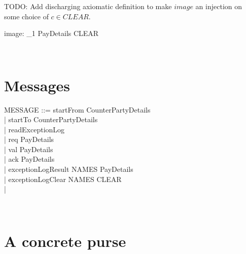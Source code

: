%
TODO: Add discharging axiomatic definition to make
$image$ an injection on some choice of $c \in CLEAR$.
%
\begin{LADef}
\begin{axdef}
   image: \power_1 PayDetails \inj CLEAR
\end{axdef}~\end{LADef}

\section{Messages}
\begin{LFType}
\begin{zed}
   MESSAGE ::= startFrom \ldata CounterPartyDetails \rdata \\
           | startTo \ldata CounterPartyDetails \rdata \\
           | readExceptionLog \\
           | req \ldata PayDetails \rdata \\
           | val \ldata PayDetails \rdata \\
           | ack \ldata PayDetails \rdata \\
           | exceptionLogResult \ldata NAMES \cross PayDetails \rdata \\
           | exceptionLogClear \ldata NAMES \cross CLEAR \rdata \\
           | \bot
\end{zed}~\end{LFType}

\section{A concrete purse}


